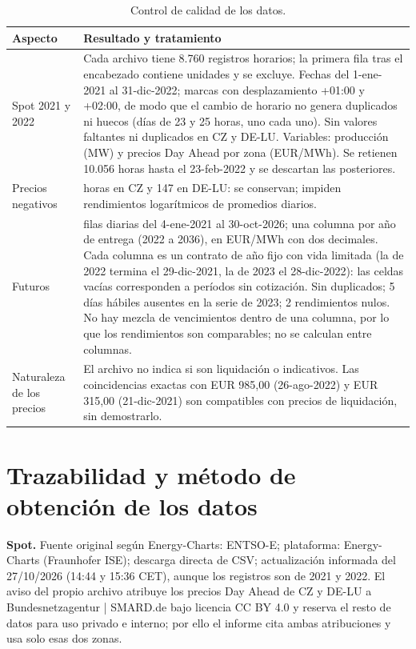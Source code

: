 \documentclass[11pt,letterpaper]{article}
\theoremstyle{plain}
\theoremstyle{definition}
\theoremstyle{remark}
\numberwithin{equation}{section}
\newcommand{\sw}{\begin{singlespace}}
\newcommand{\ew}{\end{singlespace}}
\begin{document}
\sw
\begin{table}[H]
\centering
\scriptsize
\begin{tabularx}{\textwidth}{@{}>{\RaggedRight}p{3.2cm}>{\RaggedRight}X@{}}
\toprule
Aspecto & Resultado y tratamiento \\
\midrule
Spot 2021 y 2022 & Cada archivo tiene 8.760 registros horarios; la primera fila tras el encabezado contiene unidades y se excluye. Fechas del 1-ene-2021 al 31-dic-2022; marcas con desplazamiento +01:00 y +02:00, de modo que el cambio de horario no genera duplicados ni huecos (días de 23 y 25 horas, uno cada uno). Sin valores faltantes ni duplicados en CZ y DE-LU. Variables: producción (MW) y precios Day Ahead por zona (EUR/MWh). Se retienen 10.056 horas hasta el 23-feb-2022 y se descartan las posteriores. \\
Precios negativos & 33 horas en CZ y 147 en DE-LU: se conservan; impiden rendimientos logarítmicos de promedios diarios. \\
Futuros & 1.494 filas diarias del 4-ene-2021 al 30-oct-2026; una columna por año de entrega (2022 a 2036), en EUR/MWh con dos decimales. Cada columna es un contrato de año fijo con vida limitada (la de 2022 termina el 29-dic-2021, la de 2023 el 28-dic-2022): las celdas vacías corresponden a períodos sin cotización. Sin duplicados; 5 días hábiles ausentes en la serie de 2023; 2 rendimientos nulos. No hay mezcla de vencimientos dentro de una columna, por lo que los rendimientos son comparables; no se calculan entre columnas. \\
Naturaleza de los precios & El archivo no indica si son liquidación o indicativos. Las coincidencias exactas con EUR 985,00 (26-ago-2022) y EUR 315,00 (21-dic-2021) son compatibles con precios de liquidación, sin demostrarlo. \\
\bottomrule
\end{tabularx}
\caption{Control de calidad de los datos.}
\end{table}
\ew

\section{Trazabilidad y método de obtención de los datos}

\textbf{Spot.} Fuente original según Energy-Charts: ENTSO-E; plataforma: Energy-Charts (Fraunhofer ISE); descarga directa de CSV; actualización informada del 27/10/2026 (14:44 y 15:36 CET), aunque los registros son de 2021 y 2022. El aviso del propio archivo atribuye los precios Day Ahead de CZ y DE-LU a Bundesnetzagentur | SMARD.de bajo licencia CC BY 4.0 y reserva el resto de datos para uso privado e interno; por ello el informe cita ambas atribuciones y usa solo esas dos zonas.
\end{document}
